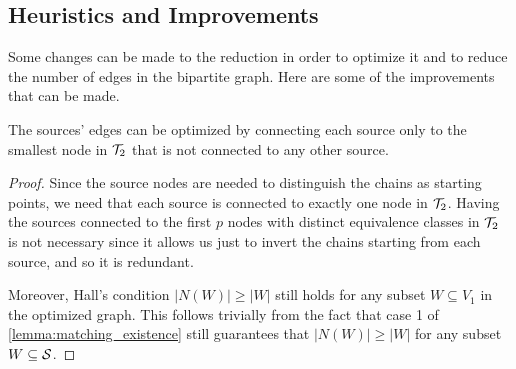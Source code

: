 \subsection{Heuristics and Improvements}
Some changes can be made to the reduction in order to optimize it and to reduce the number of edges in the bipartite graph. Here are some of the improvements that can be made.
    
\begin{lemma} \label{lemma:sources_optimization}
    The sources' edges can be optimized by connecting each source only to the smallest node in $\mathcal{T}_{2}$ that is not connected to any other source.
\end{lemma}

\begin{proof}
    Since the source nodes are needed to distinguish the chains as starting points, we need that each source is connected to exactly one node in $\mathcal{T}_{2}$. Having the sources connected to the first $p$ nodes with distinct equivalence classes in $\mathcal{T}_{2}$ is not necessary since it allows us just to invert the chains starting from each source, and so it is redundant. 

    Moreover, Hall's condition $|N(W)| \geq |W|$ still holds for any subset $W \subseteq V_1$ in the optimized graph. This follows trivially from the fact that case 1 of \cref{lemma:matching_existence} still guarantees that $|N(W)| \geq |W|$ for any subset $W \subseteq \mathcal{S}$.
\end{proof}

